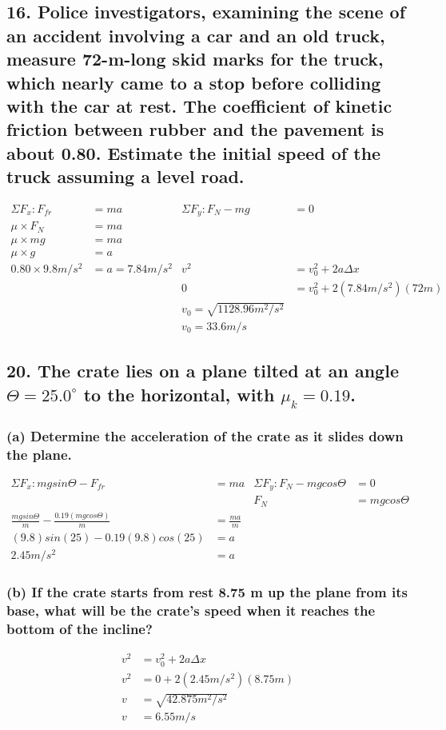 \documentclass[12pt,a4paper,english]{article}
\newcommand{\degree}[1]{${#1}^\circ$}
\begin{document}
\begin{flushleft}
  \subsection{16. Police investigators, examining the scene of an accident involving a car and an old truck, measure 72-m-long skid marks for the truck, which nearly came to a stop before colliding with the car at rest. The coefficient of kinetic friction between rubber and the pavement is about 0.80. Estimate the initial speed of the truck assuming a level road.}
  \begin{align*}
    \Sigma F_x: F_{fr}&=ma
      &\Sigma F_y: F_N-mg&=0
      \\
    \mu\times F_N&=ma
                 \\
    \mu\times mg&=ma
                \\
    \mu\times g&=a
    \\
    0.80\times 9.8m/s^2&=a=7.84m/s^2
                       &v^2&=v_0^2+2a\Delta x
                       \\
                       &&0&=v_0^2+2(7.84m/s^2)(72m)
                       \\
                       &&v_0=\sqrt{1128.96m^2/s^2}
                       \\
                       &&v_0=33.6m/s
  \end{align*}
  \subsection{20. The crate lies on a plane tilted at an angle $\Theta=$\degree{25.0} to the horizontal, with $\mu_k=0.19$.}
  \subsubsection{(a) Determine the acceleration of the crate as it slides down the plane.}
  \begin{align*}
    \Sigma F_x: mgsin\Theta-F_{fr}&=ma
      &\Sigma F_y: F_N-mgcos\Theta&=0
      \\
    &&F_N&=mgcos\Theta
      \\
    \frac{mgsin\Theta}{m}-\frac{0.19(mgcos\Theta)}{m}&=\frac{ma}{m}
    \\
    (9.8)sin(25)-0.19(9.8)cos(25)&=a
    \\
                                 2.45m/s^2&=a
  \end{align*}
  \subsubsection{(b) If the crate starts from rest 8.75 m up the plane from its base, what will be the crate's speed when it reaches the bottom of the incline?}
  \begin{align*}
    v^2&=v_0^2+2a\Delta x
    \\
    v^2&=0+2(2.45m/s^2)(8.75m)
    \\
    v&=\sqrt{42.875m^2/s^2}
    \\
    v&=6.55m/s
  \end{align*}

\end{flushleft}
\end{document}

